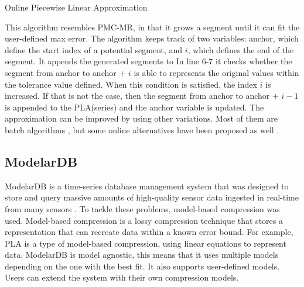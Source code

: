 \begin{algorithm}
\caption{Online Piecewise Linear Approximation \cite{Lazaridis2003Capturing}}\label{PLA}
\begin{algorithmic}[1]
    \EndWhile
\EndWhile
{}
\EndProcedure
\end{algorithmic}
\end{algorithm}

This algorithm resembles PMC-MR, in that it grows a segment until it can fit the user-defined
max error. The algorithm keeps track of two variables: anchor, which define the start index
of a potential segment, and $i$, which defines the end of the segment. It appends the generated
segments to  In line 6-7 it checks
whether the segment from anchor to anchor + $i$ is able to represents the original values
within the tolerance value defined.
When this condition is satisfied, the index $i$ is increased. If that is not the case,
then the segment from anchor to anchor + $i - 1$ is appended to the PLA(series)
and the anchor variable is updated. The approximation can be improved by using other variations.
Most of them are batch algorithms \cite{Douglas1973Algorithms}\cite{Park1999Fast}
\cite{Keogh1998An}, but some online alternatives have been
proposed as well \cite{Keogh2001An}.

\subsection{ModelarDB}
ModelarDB is a time-series database management system that was designed to store and query
massive amounts of high-quality sensor data ingested in real-time from many sensors
\cite{jensen_2018_modelardb}.
To tackle these problems, model-based compression was used. Model-based compression is a
lossy compression technique that stores a representation that can recreate data within a
known error bound. For example, PLA is a type of model-based compression, using linear
equations to represent data. ModelarDB is model agnostic, this means that it uses multiple
models depending on the one with the best fit. It also supports user-defined models.
Users can extend the system with their own compression models.

